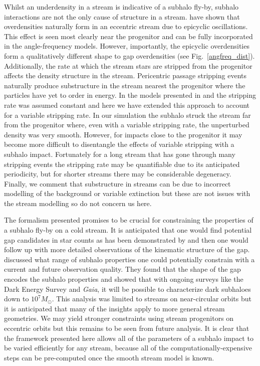 \documentclass[useAMS,usenatbib,fleqn,a4paper]{mn2e}
\begin{document}
Whilst an underdensity in a stream is indicative of a subhalo fly-by, subhalo interactions are not the only cause of structure in a stream. \cite{Kuepper2010} have shown that overdensities naturally form in an eccentric stream due to epicyclic oscillations. This effect is seen most clearly near the progenitor and can be fully incorporated in the angle-frequency models. However, importantly, the epicyclic overdensities form a qualitatively different shape to gap overdensities (see Fig.~\ref{angfreq_dist}). Additionally, the rate at which the stream stars are stripped from the progenitor affects the density structure in the stream. Pericentric passage stripping events naturally produce substructure in the stream nearest the progenitor where the particles have yet to order in energy. In the models presented in \cite{Bovy2014} and \cite{Sanders2014} the stripping rate was assumed constant and here we have extended this approach to account for a variable stripping rate. In our simulation the subhalo struck the stream far from the progenitor where, even with a variable stripping rate, the unperturbed density was very smooth. However, for impacts close to the progenitor it may become more difficult to disentangle the effects of variable stripping with a subhalo impact. Fortunately for a long stream that has gone through many stripping events the stripping rate may be quantifiable due to its anticipated periodicity, but for shorter streams there may be considerable degeneracy. Finally, we comment that substructure in streams can be due to incorrect modelling of the background or variable extinction but these are not issues with the stream modelling so do not concern us here.

The formalism presented promises to be crucial for constraining the properties of a subhalo fly-by on a cold stream. It is anticipated that one would find potential gap candidates in star counts as has been demonstrated by \cite{Carlberg2013} and then one would follow up with more detailed observations of the kinematic structure of the gap. \cite{ErkalBelokurov2015b} discussed what range of subhalo properties one could potentially constrain with a current and future observation quality. They found that the shape of the gap encodes the subhalo properties and showed that with ongoing surveys like the Dark Energy Survey and \textit{Gaia}, it will be possible to characterize dark subhaloes down to $10^7M_\odot$. This analysis was limited to streams on near-circular orbits but it is anticipated that many of the insights apply to more general stream geometries. We may yield stronger constraints using stream progenitors on eccentric orbits but this remains to be seen from future analysis. It is clear that the framework presented here allows all of the parameters of a subhalo impact to be varied efficiently for any stream, because all of the computationally-expensive steps can be pre-computed once the smooth stream model is known.
\end{document}
